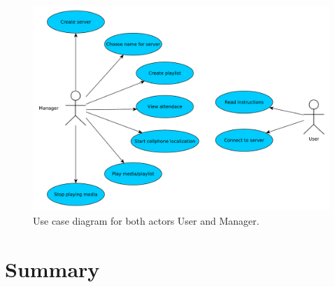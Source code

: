 \begin{figure}[h]
    \begin{center}
    \includegraphics[scale=0.4]{images/usecase.pdf}
    \caption{Use case diagram for both actors User and Manager.}
    \label{img:usecase}
    \end{center}
\end{figure}

%	
%		

\section{Summary}
